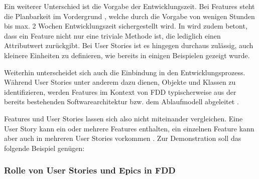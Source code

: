 \documentclass[acmtog]{acmart}
\begin{document}
Ein weiterer Unterschied ist die Vorgabe der Entwicklungszeit.
Bei Features steht die Planbarkeit im Vordergrund \cite{hunt06}, welche durch die Vorgabe von wenigen Stunden bis max. 2 Wochen Entwicklungszeit sichergestellt wird.
In \cite{palmer02} wird zudem betont, dass ein Feature nicht nur eine triviale Methode ist, die lediglich einen Attributwert zurückgibt.
Bei User Stories ist es hingegen durchaus zulässig, auch kleinere Einheiten zu definieren, wie bereits in einigen Beispielen gezeigt wurde.

Weiterhin unterscheidet sich auch die Einbindung in den Entwicklungsprozess.
Während User Stories unter anderem dazu dienen, Objekte und Klassen zu identifizieren, werden Features im Kontext von FDD typischerweise aus der bereits bestehenden Softwarearchitektur bzw. dem Ablaufmodell abgeleitet \cite{palmer02}.

Features und User Stories lassen sich also nicht miteinander vergleichen. Eine User Story kann ein oder mehrere Features enthalten, ein einzelnen Feature kann aber auch in mehreren User Stories vorkommen \cite{hunt06}. Zur Demonstration soll das folgende Beispiel genügen:\smallskip


\subsubsection{Rolle von User Stories und Epics in FDD}
\end{document}
